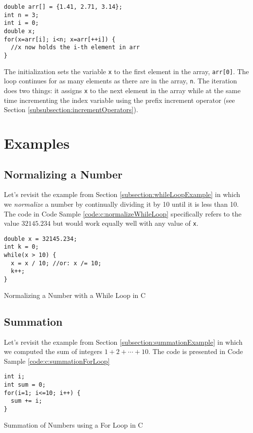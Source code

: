 \begin{verbatim}
double arr[] = {1.41, 2.71, 3.14};
int n = 3;
int i = 0;
double x;
for(x=arr[i]; i<n; x=arr[++i]) {
  //x now holds the i-th element in arr
}
\end{verbatim}

The initialization sets the variable \texttt{x} to the first element in
the array, \texttt{arr[0]}.  The loop continues for as many elements
as there are in the array, \texttt{n}.  The iteration does two things:
it assigns \texttt{x} to the next element in the array while at the
same time incrementing the index variable using the prefix increment 
operator (see Section \ref{subsubsection:incrementOperators}).

\section{Examples}

\subsection{Normalizing a Number}

Let's revisit the example from Section \ref{subsection:whileLoopExample} in which 
we \emph{normalize} a number by continually dividing it by 10 until it is less 
than 10.  The code in Code Sample \ref{code:c:normalizeWhileLoop} specifically
refers to the value $32145.234$ but would work equally well with any value of 
\texttt{x}.

\begin{listing}[H]
\begin{verbatim}
double x = 32145.234;
int k = 0;
while(x > 10) {
  x = x / 10; //or: x /= 10;
  k++;
}
\end{verbatim}
  \caption{Normalizing a Number with a While Loop in C}
  \label{code:c:normalizeWhileLoop}
\end{listing}

\subsection{Summation}

Let's revisit the example from Section \ref{subsection:summationExample} in which
we computed the sum of integers $1 + 2 + \cdots + 10$.  The code is presented in
Code Sample \ref{code:c:summationForLoop}

\begin{listing}[H]
\begin{verbatim}
int i;
int sum = 0;
for(i=1; i<=10; i++) {
  sum += i;
}
\end{verbatim}
  \caption{Summation of Numbers using a For Loop in C}
  \label{code:c:summationForLoop}
\end{listing}

